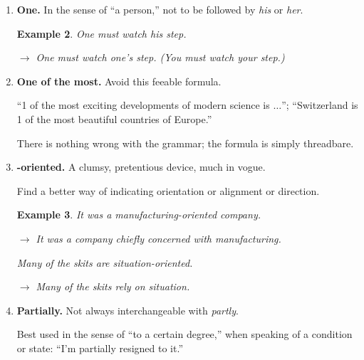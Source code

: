 \documentclass{article}
\newtheorem{example}{Example}
\begin{document}
\begin{enumerate}
	{\it Ongoing} is a mix of ``continuing'' \& ``active'' \& is usually superfluous.
	\begin{example}
		He devoted all his spare time to the ongoing program for aid to the elderly.
		
		$\to$ He devoted all his spare time to the program for aid to the elderly.
	\end{example}
	{\it Offputting} might mean ``objectionable,'' ``disconcerting,'' ``distasteful.''
	
	Select instead a word whose meaning is clear.
	
	As a simple test, transform the participles to verbs.
	
	It is possible to {\it upset} something.
	
	But to {\it offput}?
	
	To {\it ongo}?
	\item {\bf One.} In the sense of ``a person,'' not to be followed by {\it his} or {\it her}.
	\begin{example}
		One must watch his step.
		
		$\to$ One must watch one's step. (You must watch your step.)
	\end{example}
	\item {\bf One of the most.} Avoid this feeable formula.
	
	``1 of the most exciting developments of modern science is $\ldots$''; ``Switzerland is 1 of the most beautiful countries of Europe.''
	
	There is nothing wrong with the grammar; the formula is simply threadbare.
	\item {\bf -oriented.} A clumsy, pretentious device, much in vogue.
	
	Find a better way of indicating orientation or alignment or direction.
	\begin{example}
		It was a manufacturing-oriented company.
		
		$\to$ It was a company chiefly concerned with manufacturing.
		
		Many of the skits are situation-oriented.
		
		$\to$ Many of the skits rely on situation.
	\end{example}
	\item {\bf Partially.} Not always interchangeable with {\it partly}.
	
	Best used in the sense of ``to a certain degree,'' when speaking of a condition or state: ``I'm partially resigned to it.''
	

\end{enumerate}
\end{document}
